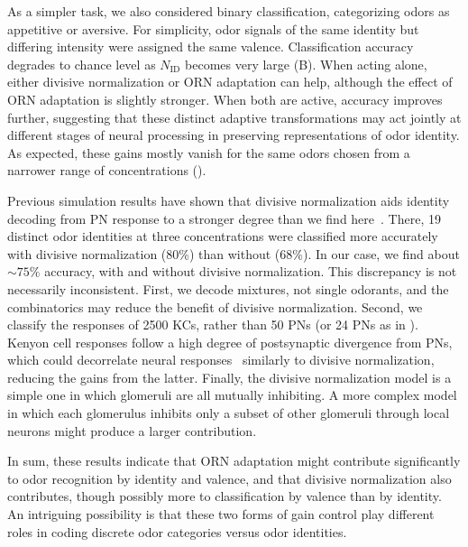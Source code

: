 \documentclass[9pt,lineno]{elife}
\begin{document}
As a simpler task, we also considered binary classification, categorizing odors as appetitive or aversive. For simplicity, odor signals of the same identity but differing intensity were assigned the same valence. Classification accuracy degrades to chance level as $N_{\text {ID}}$ becomes very large (B). When acting alone, either divisive normalization or ORN adaptation can help, although the effect of ORN adaptation is slightly stronger. When both are active, accuracy improves further, suggesting that these distinct adaptive transformations may act jointly at different stages of neural processing in preserving representations of odor identity. As expected, these gains mostly vanish for the same odors chosen from a narrower range of concentrations (). 

Previous simulation results have shown that divisive normalization aids identity decoding from PN response to a stronger degree than we find here~\citep{divisive_normalization}. There, 19 distinct odor identities at three concentrations were classified more accurately with divisive normalization (80\%) than without (68\%). In our case, we find about $\sim 75\%$ accuracy, with and without divisive normalization. This discrepancy is not necessarily inconsistent. 
First, we decode mixtures, not single odorants, and the combinatorics may reduce the benefit of divisive normalization. Second, we  classify the responses of 2500 KCs, rather than 50 PNs (or 24 PNs as in \citet{divisive_normalization}). Kenyon cell responses follow a high degree of postsynaptic divergence from PNs, which could decorrelate neural responses~\citep{abbott_axel,litwinkumar,vijay_1} similarly to divisive normalization, reducing the gains from the latter. Finally, the divisive normalization model is a simple one in which glomeruli are all mutually inhibiting. A more complex model in which each glomerulus inhibits only a subset of other glomeruli through local neurons might produce a larger contribution.

In sum, these results indicate that ORN adaptation might contribute significantly to odor recognition by identity and valence, and that divisive normalization also contributes, though possibly more to classification by valence than by identity. An intriguing possibility is that these two forms of gain control play different roles in coding discrete odor categories versus odor identities.
\end{document}
